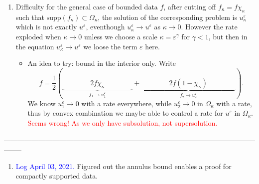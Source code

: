 \documentclass[10pt]{article}
\theoremstyle{plain}
\theoremstyle{remark}
\begin{document}
\begin{enumerate}
\item Difficulty for the general case of bounded data $f$, after cutting off $f_\kappa = f\chi_\kappa$ such that $\mathrm{supp}(f_\kappa)\subset \Omega_\kappa$, the solution of the corresponding problem is $u^\varepsilon_\kappa$ which is not exactly $u^\varepsilon$, eventhough $u^\varepsilon_\kappa\to u^\varepsilon$ as $\kappa \to 0$. However the rate exploded when $\kappa \to 0$ unless we choose a scale $\kappa = \varepsilon^\gamma$ for $\gamma < 1$, but then in the equation $u^\varepsilon_\kappa\to u^\varepsilon$ we loose the term $\varepsilon$ here. 
\begin{itemize}
    \item An idea to try: bound in the interior only. Write
    \begin{equation*}
        f = \frac{1}{2}\left( \underbrace{\qquad\qquad 2f\chi_\kappa\qquad\qquad}_{f_1 \longrightarrow u^\varepsilon_1} +  \underbrace{\qquad\qquad 2f(1-\chi_\kappa)\qquad\qquad}_{f_2 \longrightarrow u^\varepsilon_2}\right).
    \end{equation*}
    We know $u_1^\varepsilon\to 0$ with a rate everywhere, while $u_2^\varepsilon \to 0$ in $\Omega_\kappa$ with a rate, thus by convex combination we maybe able to control a rate for $u^\varepsilon$ in $\Omega_\kappa$. \textcolor{red}{Seems wrong! As we only have subsolution, not supersolution.}
\end{itemize}
\end{enumerate}



\begin{center}
--------------------------------------------------------------------------------------------------------------------
\end{center}
\begin{enumerate}
    \item \textcolor{blue}{Log April 03, 2021.} Figured out the annulus bound enables a proof for compactly supported data.
\end{enumerate}


{}
%

\end{document}
